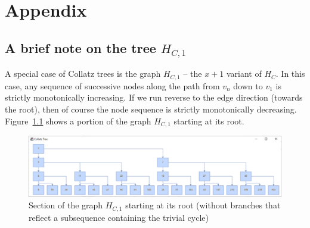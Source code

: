 \appendix
\chapter{Appendix}

\section{\texorpdfstring{A brief note on the tree $H_{C,1}$}{A brief note on the tree HC1}}
\label{appx:x_plus_1_variant}
A special case of Collatz trees is the graph $H_{C,1}$ -- the $x+1$ variant of $H_C$. In this case, any sequence of successive nodes along the path from $v_n$ down to $v_1$ is strictly monotonically increasing. If we run reverse to the edge direction (towards the root), then of course the node sequence is strictly monotonically decreasing. Figure~\ref{fig:hc1} shows a portion of the graph $H_{C,1}$ starting at its root.

\begin{figure}[H]
	\includegraphics[width=1.00\textwidth]{figures/h_c1.png}
	\caption{Section of the graph $H_{C,1}$ starting at its root (without branches that reflect a subsequence containing the trivial cycle)}
	\label{fig:hc1}
\end{figure}


